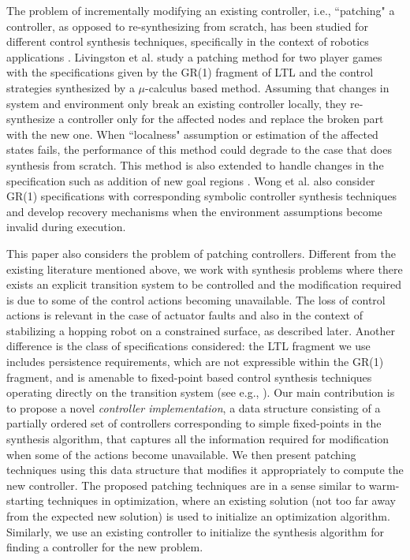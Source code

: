 The problem of incrementally modifying an existing controller, i.e., ``patching" a controller, as opposed to re-synthesizing from scratch, has been studied for different control synthesis techniques, specifically in the context of robotics applications \cite{Livingston,Livingston2014,wong2014correct}. Livingston et al. \cite{Livingston} study a patching method for two player games with the specifications given by the GR(1) fragment of LTL and the control strategies synthesized by a $ \mu $-calculus based method. Assuming that changes in system and environment only break an existing controller locally, they re-synthesize a controller only for the affected nodes and replace the broken part with the new one. When ``localness" assumption or estimation of the affected states fails, the performance of this method could degrade to the case that does synthesis from scratch. This method is also extended to handle changes in the specification such as addition of new goal regions \cite{Livingston2014}. Wong et al. \cite{wong2014correct} also consider GR(1) specifications with corresponding symbolic controller synthesis techniques and develop recovery mechanisms when the environment assumptions become invalid during execution. 

This paper also considers the problem of patching controllers. Different from the existing literature mentioned above, we work with synthesis problems where there exists an explicit transition system to be controlled and the modification required is due to some of the control actions becoming unavailable. The loss of control actions is relevant in the case of actuator faults and also in the context of stabilizing a hopping robot on a constrained surface, as described later. Another difference is the class of specifications considered: the LTL fragment we use includes persistence requirements, which are not expressible within the GR(1) fragment, and is amenable to fixed-point based control synthesis techniques operating directly on the transition system (see e.g., \cite{wolff2013efficient,Nilsson2017}). Our main contribution is to propose a novel \emph{controller implementation}, a data structure consisting of a partially ordered set of controllers corresponding to simple fixed-points in the synthesis algorithm,  that captures all the information required for modification when some of the actions become unavailable. We then present patching techniques using this data structure that modifies it appropriately to compute the new controller. The proposed patching techniques are in a sense similar to warm-starting techniques in optimization, where an existing solution (not too far away from the expected new solution) is used to initialize an optimization algorithm. Similarly, we use an existing controller to initialize the synthesis algorithm for finding a controller for the new problem. 

